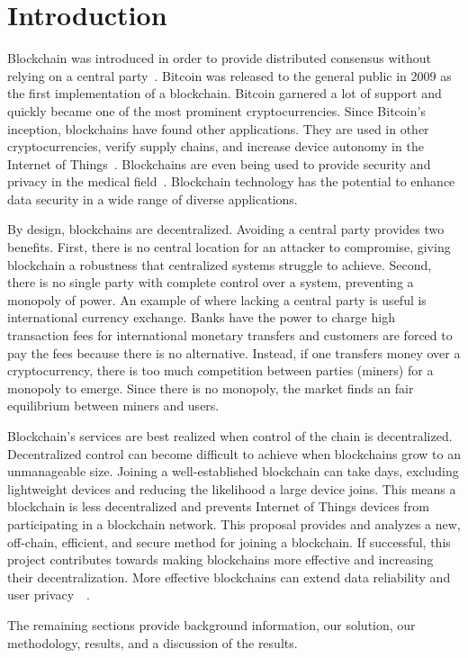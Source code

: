 \section{Introduction}
\label{sec:introduction}



Blockchain was introduced in order to provide distributed consensus without relying on a central party~\cite{nakamoto2009Bitcoin}.
Bitcoin was released to the general public in 2009 as the first implementation of a blockchain.
Bitcoin garnered a lot of support and quickly became one of the most prominent cryptocurrencies.
Since Bitcoin's inception, blockchains have found other applications.
They are used in other cryptocurrencies, verify supply chains, and increase device autonomy in the Internet of Things~\cite{cai2018DecentralizedApplications}.
Blockchains are even being used to provide security and privacy in the medical field~\cite{siyal2019MedicalApplications}.
Blockchain technology has the potential to enhance data security in a wide range of diverse applications.

By design, blockchains are decentralized.
Avoiding a central party provides two benefits.
First, there is no central location for an attacker to compromise, giving blockchain a robustness that centralized systems struggle to achieve.
Second, there is no single party with complete control over a system, preventing a monopoly of power.
An example of where lacking a central party is useful is international currency exchange.
Banks have the power to charge high transaction fees for international monetary transfers and customers are forced to pay the fees because there is no alternative.
Instead, if one transfers money over a cryptocurrency, there is too much competition between parties (miners) for a monopoly to emerge.
Since there is no monopoly, the market finds an fair equilibrium between miners and users.

Blockchain’s services are best realized when control of the chain is decentralized.
Decentralized control can become difficult to achieve when blockchains grow to an unmanageable size.
Joining a well-established blockchain can take days, excluding lightweight devices and reducing the likelihood a large device joins.
This means a blockchain is less decentralized and prevents Internet of Things devices from participating in a blockchain network.
This proposal provides and analyzes a new, off-chain, efficient, and secure method for joining a blockchain.
If successful, this project contributes towards making blockchains more effective and increasing their decentralization.
More effective blockchains can extend data reliability and user privacy~\cite{cai2018DecentralizedApplications}~\cite{siyal2019MedicalApplications}.

The remaining sections provide background information, our solution, our methodology, results, and a discussion of the results.
